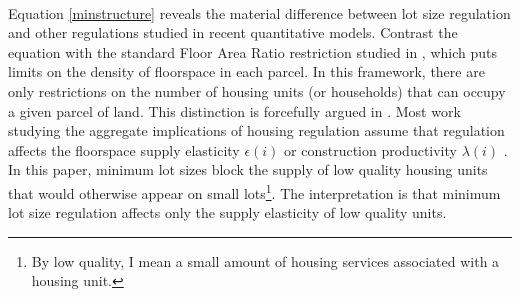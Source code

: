 \documentclass[12pt]{article}
\begin{document}
	\paragraph*{}
	Equation \eqref{minstructure} reveals the material difference between lot size regulation and other regulations studied in recent quantitative models. Contrast the equation with the standard Floor Area Ratio restriction studied in \cite{bruecknersingh}, which puts limits on the density of floorspace in each parcel. In this framework, there are only restrictions on the number of housing units (or households) that can occupy a given parcel of land. This distinction is forcefully argued in \cite{griesonwhite}. Most work studying the aggregate implications of housing regulation assume that regulation affects the floorspace supply elasticity $\epsilon(i)$ or construction productivity $\lambda(i)$ \citep{hseihmoretti, parkho, hop}. In this paper, minimum lot sizes block the supply of low quality housing units that would otherwise appear on small lots\footnote{By low quality, I mean a small amount of housing services associated with a housing unit.}. The interpretation is that minimum lot size regulation affects only the supply elasticity of low quality units. 
	
	
\end{document}
